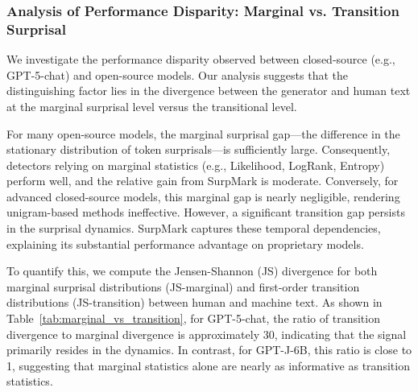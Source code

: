 \documentclass{article}
\theoremstyle{plain}
\theoremstyle{definition}
\theoremstyle{remark}
\begin{document}
\subsubsection{ \quad Analysis of Performance Disparity: Marginal vs. Transition Surprisal} \label{marginal-transition}
We investigate the performance disparity observed between closed-source (e.g., GPT-5-chat) and open-source models. Our analysis suggests that the distinguishing factor lies in the divergence between the generator and human text at the marginal surprisal level versus the transitional level.

For many open-source models, the marginal surprisal gap—the difference in the stationary distribution of token surprisals—is sufficiently large. Consequently, detectors relying on marginal statistics (e.g., Likelihood, LogRank, Entropy) perform well, and the relative gain from SurpMark is moderate. Conversely, for advanced closed-source models, this marginal gap is nearly negligible, rendering unigram-based methods ineffective. However, a significant transition gap persists in the surprisal dynamics. SurpMark captures these temporal dependencies, explaining its substantial performance advantage on proprietary models.

To quantify this, we compute the Jensen-Shannon (JS) divergence for both marginal surprisal distributions (JS-marginal) and first-order transition distributions (JS-transition) between human and machine text. As shown in Table~\ref{tab:marginal_vs_transition}, for GPT-5-chat, the ratio of transition divergence to marginal divergence is approximately 30, indicating that the signal primarily resides in the dynamics. In contrast, for GPT-J-6B, this ratio is close to 1, suggesting that marginal statistics alone are nearly as informative as transition statistics.
\end{document}
